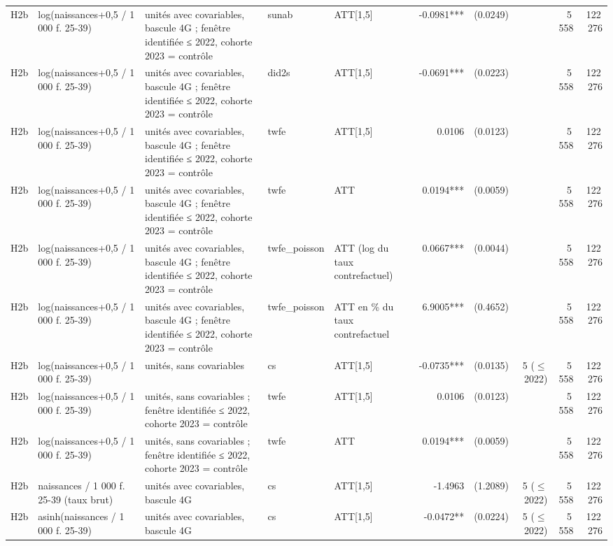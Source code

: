 \begin{table}
\begin{threeparttable}
\begin{tabular}{lp{3.8cm}p{6.5cm}lp{3.5cm}rrrrr}
H2b & log(naissances+0,5 / 1 000 f. 25-39) & unités avec covariables, bascule 4G ; fenêtre identifiée ≤ 2022, cohorte 2023 = contrôle & sunab & ATT[1,5] & -0.0981*** & (0.0249) &  & 5\,558 & 122\,276 \\
H2b & log(naissances+0,5 / 1 000 f. 25-39) & unités avec covariables, bascule 4G ; fenêtre identifiée ≤ 2022, cohorte 2023 = contrôle & did2s & ATT[1,5] & -0.0691*** & (0.0223) &  & 5\,558 & 122\,276 \\
H2b & log(naissances+0,5 / 1 000 f. 25-39) & unités avec covariables, bascule 4G ; fenêtre identifiée ≤ 2022, cohorte 2023 = contrôle & twfe & ATT[1,5] & 0.0106 & (0.0123) &  & 5\,558 & 122\,276 \\
H2b & log(naissances+0,5 / 1 000 f. 25-39) & unités avec covariables, bascule 4G ; fenêtre identifiée ≤ 2022, cohorte 2023 = contrôle & twfe & ATT & 0.0194*** & (0.0059) &  & 5\,558 & 122\,276 \\
H2b & log(naissances+0,5 / 1 000 f. 25-39) & unités avec covariables, bascule 4G ; fenêtre identifiée ≤ 2022, cohorte 2023 = contrôle & twfe\_poisson & ATT (log du taux contrefactuel) & 0.0667*** & (0.0044) &  & 5\,558 & 122\,276 \\
H2b & log(naissances+0,5 / 1 000 f. 25-39) & unités avec covariables, bascule 4G ; fenêtre identifiée ≤ 2022, cohorte 2023 = contrôle & twfe\_poisson & ATT en \% du taux contrefactuel & 6.9005*** & (0.4652) &  & 5\,558 & 122\,276 \\
H2b & log(naissances+0,5 / 1 000 f. 25-39) & unités, sans covariables & cs & ATT[1,5] & -0.0735*** & (0.0135) & 5 ($\leq$ 2022) & 5\,558 & 122\,276 \\
H2b & log(naissances+0,5 / 1 000 f. 25-39) & unités, sans covariables ; fenêtre identifiée ≤ 2022, cohorte 2023 = contrôle & twfe & ATT[1,5] & 0.0106 & (0.0123) &  & 5\,558 & 122\,276 \\
H2b & log(naissances+0,5 / 1 000 f. 25-39) & unités, sans covariables ; fenêtre identifiée ≤ 2022, cohorte 2023 = contrôle & twfe & ATT & 0.0194*** & (0.0059) &  & 5\,558 & 122\,276 \\
H2b & naissances / 1 000 f. 25-39 (taux brut) & unités avec covariables, bascule 4G & cs & ATT[1,5] & -1.4963 & (1.2089) & 5 ($\leq$ 2022) & 5\,558 & 122\,276 \\
H2b & asinh(naissances / 1 000 f. 25-39) & unités avec covariables, bascule 4G & cs & ATT[1,5] & -0.0472** & (0.0224) & 5 ($\leq$ 2022) & 5\,558 & 122\,276 \\
\bottomrule
\end{tabular}

\end{threeparttable}
\end{table}
